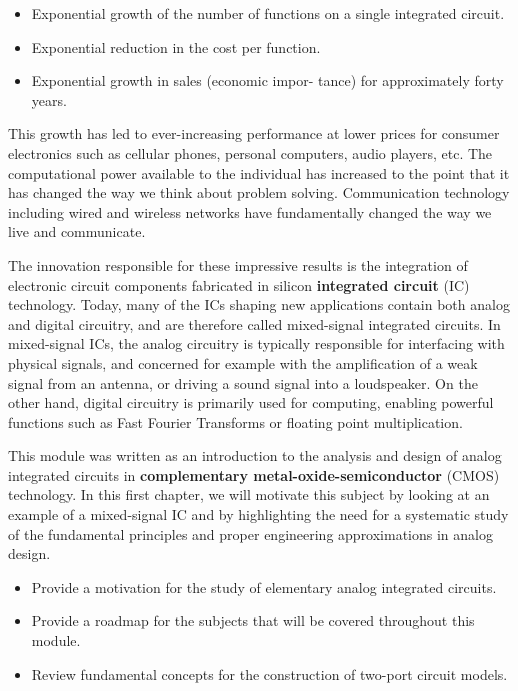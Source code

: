 \documentclass[
  11pt,
  letterpaper,
  abstract]{scrbook}
\begin{document}
\begin{itemize}
\item
  Exponential growth of the number of functions on a single integrated
  circuit.
\item
  Exponential reduction in the cost per function.
\item
  Exponential growth in sales (economic impor- tance) for approximately
  forty years.
\end{itemize}

This growth has led to ever-increasing performance at lower prices for
consumer electronics such as cellular phones, personal computers, audio
players, etc. The computational power available to the individual has
increased to the point that it has changed the way we think about
problem solving. Communication technology including wired and wireless
networks have fundamentally changed the way we live and communicate.

The innovation responsible for these impressive results is the
integration of electronic circuit components fabricated in silicon
\textbf{integrated circuit} (IC) technology. Today, many of the ICs
shaping new applications contain both analog and digital circuitry, and
are therefore called mixed-signal integrated circuits. In mixed-signal
ICs, the analog circuitry is typically responsible for interfacing with
physical signals, and concerned for example with the amplification of a
weak signal from an antenna, or driving a sound signal into a
loudspeaker. On the other hand, digital circuitry is primarily used for
computing, enabling powerful functions such as Fast Fourier Transforms
or floating point multiplication.

This module was written as an introduction to the analysis and design of
analog integrated circuits in \textbf{complementary
metal-oxide-semiconductor} (CMOS) technology. In this first chapter, we
will motivate this subject by looking at an example of a mixed-signal IC
and by highlighting the need for a systematic study of the fundamental
principles and proper engineering approximations in analog design.

\begin{tcolorbox}[enhanced jigsaw, opacityback=0, breakable, colback=white, rightrule=.15mm, colbacktitle=quarto-callout-tip-color!10!white, left=2mm, toptitle=1mm, arc=.35mm, titlerule=0mm, title=\textcolor{quarto-callout-tip-color}{\faLightbulb}\hspace{0.5em}{Chapter Objectives}, opacitybacktitle=0.6, bottomrule=.15mm, leftrule=.75mm, colframe=quarto-callout-tip-color-frame, bottomtitle=1mm, toprule=.15mm, coltitle=black]

\begin{itemize}
\item
  Provide a motivation for the study of elementary analog integrated
  circuits.
\item
  Provide a roadmap for the subjects that will be covered throughout
  this module.
\item
  Review fundamental concepts for the construction of two-port circuit
  models.
\end{itemize}

\end{tcolorbox}
\end{document}
